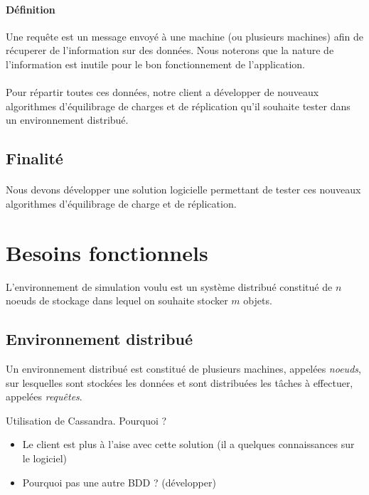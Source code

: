 \documentclass[12pt]{article}
\begin{document}
\paragraph{Définition} Une requête est un message envoyé à une machine (ou plusieurs machines) afin de récuperer de l'information sur des données.
Nous noterons que la nature de l'information est inutile pour le bon fonctionnement de l'application.


\paragraph{} Pour répartir toutes ces données, notre client a développer de nouveaux algorithmes d'équilibrage de charges et de réplication qu'il souhaite tester dans un environnement distribué.

\subsection{Finalité}

\paragraph{} Nous devons développer une solution logicielle permettant de tester ces nouveaux algorithmes d'équilibrage de charge et de réplication.


\section{Besoins fonctionnels}

L'environnement de simulation voulu est un système distribué constitué de $n$ noeuds de stockage dans lequel on souhaite stocker $m$ objets.

\subsection{Environnement distribué}

Un environnement distribué est constitué de plusieurs machines, appelées \textit{noeuds}, sur lesquelles sont stockées les données et sont distribuées les tâches à effectuer, appelées \textit{requêtes}.
	
\vspace{0.5cm}
Utilisation de Cassandra. Pourquoi ? \newline
\begin{itemize}
 \item Le client est plus à l'aise avec cette solution (il a quelques connaissances sur le logiciel)
 \item Pourquoi pas une autre BDD ? (développer)
\end{itemize}
\end{document}
